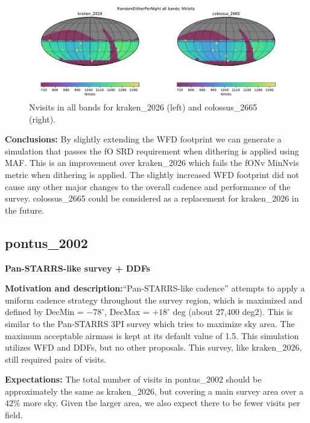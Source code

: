 \documentclass[DM,authoryear,toc]{lsstdoc}
\begin{document}
\begin{figure}[ht]
\centering
\includegraphics[width=0.98\textwidth]{figures/colossus_2665_kraken_2026_NVisits_RandomDitherPerNight_all_bands_HEAL_ComboSkyMap.pdf}
\caption{Nvisits in all bands for kraken\_2026 (left) and colossus\_2665 (right).}
\label{fig:dither_nvisits-2665}
\end{figure}

\textbf{Conclusions:} By slightly extending the WFD footprint we can generate a simulation that passes the fO SRD
requirement when dithering is applied using MAF. This is an improvement over kraken\_2026 which fails the fONv MinNvis metric
when dithering is applied. The slightly increased WFD footprint did not cause any other major changes to the overall cadence and
performance of the survey. colossus\_2665 could be considered as a replacement for kraken\_2026 in the future.

\subsection{pontus\_2002} \label{pontus2002}

\textbf{Pan-STARRS-like survey + DDFs}

\textbf{Motivation and description:}``Pan-STARRS-like cadence'' attempts to apply a uniform cadence strategy
throughout the survey region, which is maximized and defined by DecMin = $-78^{\circ}$, DecMax = $+18^{\circ}$ deg (about 27,400 deg2).
This is similar to the Pan-STARRS 3PI survey which tries to maximize sky area. The maximum acceptable airmass
is kept at its default value of 1.5. This simulation utilizes WFD and DDFs, but no other proposals.
This survey, like kraken\_2026, still required pairs of visits.

\textbf{Expectations:} The total number of visits in pontus\_2002 should be approximately the same as kraken\_2026,
but covering a main survey area over a $42\%$ more sky. Given the larger area, we also expect there to be
fewer visits per field.
\end{document}
